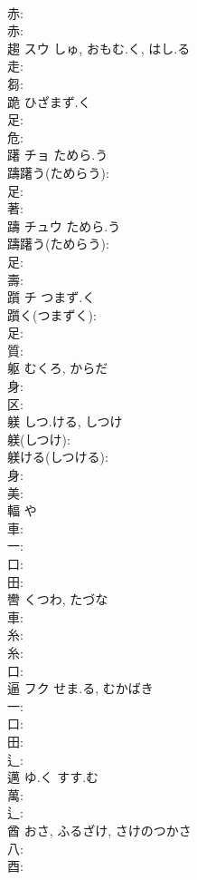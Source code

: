 \documentclass[8pt]{extreport}
\begin{document}
\begin{CJK}{UTF8}{min}
\\	赤: 
\\	赤: 
\\	趨	スウ	しゅ, おもむ.く, はし.る		
\\	走: 
\\	芻: 
\\	跪		ひざまず.く			
\\	足: 
\\	危: 
\\	躇	チョ	ためら.う		
\\	躊躇う(ためらう): 
\\	足: 
\\	著: 
\\	躊	チュウ	ためら.う		
\\	躊躇う(ためらう): 
\\	足: 
\\	壽: 
\\	躓	チ	つまず.く		
\\	躓く(つまずく): 
\\	足: 
\\	質: 
\\	躯		むくろ, からだ			
\\	身: 
\\	区: 
\\	躾		しつ.ける, しつけ			
\\	躾(しつけ): 
\\	躾ける(しつける): 
\\	身: 
\\	美: 
\\	輻		や			
\\	車: 
\\	一: 
\\	口: 
\\	田: 
\\	轡		くつわ, たづな			
\\	車: 
\\	糸: 
\\	糸: 
\\	口: 
\\	逼	フク	せま.る, むかばき		
\\	一: 
\\	口: 
\\	田: 
\\	辶: 
\\	邁		ゆ.く	すす.む		
\\	萬: 
\\	辶: 
\\	酋		おさ, ふるざけ, さけのつかさ			
\\	八: 
\\	酉: 

\end{CJK}
\end{document}
